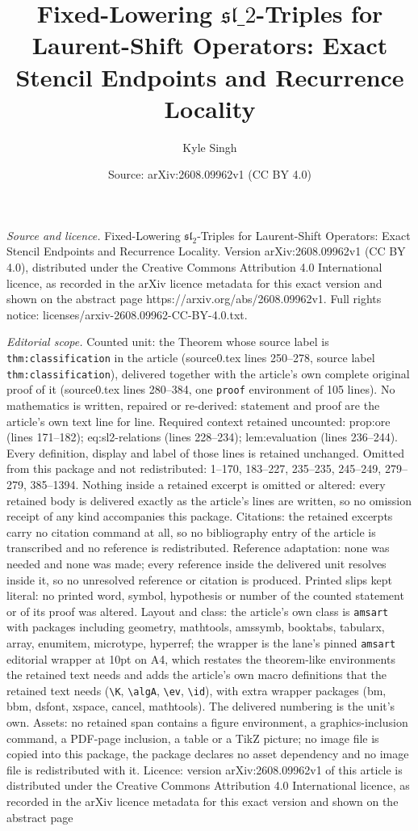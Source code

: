 \documentclass[10pt,a4paper]{amsart}
\title[Fixed-Lowering $\mathfrak{sl}\_2$-Triples for Laurent-Shift O]{Fixed-Lowering $\mathfrak{sl}\_2$-Triples for Laurent-Shift Operators: Exact Stencil Endpoints and Recurrence Locality}
\author{Kyle Singh}
\date{Source: arXiv:2608.09962v1 (CC BY 4.0)}
\begin{document}
\maketitle

\noindent\emph{Source and licence.} Fixed-Lowering $\mathfrak{sl}_2$-Triples for Laurent-Shift Operators: Exact Stencil Endpoints and Recurrence Locality. Version arXiv:2608.09962v1 (CC BY 4.0), distributed under the Creative Commons Attribution 4.0 International licence, as recorded in the arXiv licence metadata for this exact version and shown on the abstract page https://arxiv.org/abs/2608.09962v1. Full rights notice: licenses/arxiv-2608.09962-CC-BY-4.0.txt.\par\smallskip

\noindent\textit{Editorial scope.} Counted unit: the Theorem whose source label is \texttt{thm:classification} in the article (source0.tex lines 250--278, source label \texttt{thm:classification}), delivered together with the article's own complete original proof of it (source0.tex lines 280--384, one \texttt{proof} environment of 105 lines). No mathematics is written, repaired or re-derived: statement and proof are the article's own text line for line. Required context retained uncounted: prop:ore (lines 171--182); eq:sl2-relations (lines 228--234); lem:evaluation (lines 236--244). Every definition, display and label of those lines is retained unchanged. Omitted from this package and not redistributed: 1--170, 183--227, 235--235, 245--249, 279--279, 385--1394. Nothing inside a retained excerpt is omitted or altered: every retained body is delivered exactly as the article's lines are written, so no omission receipt of any kind accompanies this package. Citations: the retained excerpts carry no citation command at all, so no bibliography entry of the article is transcribed and no reference is redistributed. Reference adaptation: none was needed and none was made; every reference inside the delivered unit resolves inside it, so no unresolved reference or citation is produced. Printed slips kept literal: no printed word, symbol, hypothesis or number of the counted statement or of its proof was altered. Layout and class: the article's own class is \texttt{amsart} with packages including geometry, mathtools, amssymb, booktabs, tabularx, array, enumitem, microtype, hyperref; the wrapper is the lane's pinned \texttt{amsart} editorial wrapper at 10pt on A4, which restates the theorem-like environments the retained text needs and adds the article's own macro definitions that the retained text needs (\texttt{\textbackslash K}, \texttt{\textbackslash algA}, \texttt{\textbackslash ev}, \texttt{\textbackslash id}), with extra wrapper packages (bm, bbm, dsfont, xspace, cancel, mathtools). The delivered numbering is the unit's own. Assets: no retained span contains a figure environment, a graphics-inclusion command, a PDF-page inclusion, a table or a TikZ picture; no image file is copied into this package, the package declares no asset dependency and no image file is redistributed with it. Licence: version arXiv:2608.09962v1 of this article is distributed under the Creative Commons Attribution 4.0 International licence, as recorded in the arXiv licence metadata for this exact version and shown on the abstract page 
\end{document}

